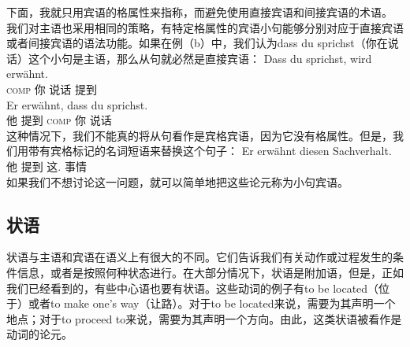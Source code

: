 下面，我就只用宾语的格属性来指称，而避免使用直接宾语和间接宾语的术语。
我们对主语也采用相同的策略，有特定格属性的宾语小句能够分别对应于直接宾语或者间接宾语的语法功能。如果在例（b）中，我们认为dass du sprichst（你在说话）这个小句是主语，那么从句就必然是直接宾语：
\eal
\ex\label{Beispiel-dass-du-sprichst} 
\gll Dass du sprichst, wird erwähnt.\\
     \textsc{comp} 你 说话 \passiveprs{} 提到\\
\ex
\gll Er erwähnt, dass du sprichst.\\
	 他 提到 \textsc{comp} 你 说话\\
\zl
这种情况下，我们不能真的将从句看作是宾格宾语，因为它没有格属性。但是，我们用带有宾格标记的名词短语来替换这个句子：
\ea
\gll Er erwähnt diesen Sachverhalt.\\
	 他 提到 这.\acc{} 事情\\
\z
如果我们不想讨论这一问题，就可以简单地把这些论元称为小句宾语。


\subsection{状语}
\label{sec-Adverbiale}
状语与主语和宾语在语义上有很大的不同。它们告诉我们有关动作或过程发生的条件信息，或者是按照何种状态进行。在大部分情况下，状语是附加语，但是，正如我们已经看到的，有些中心语也要有状语。这些动词的例子有to be located（位于）或者to make one's way（让路）。对于to be located来说，需要为其声明一个地点；对于to proceed to来说，需要为其声明一个方向。由此，这类状语被看作是动词的论元。

